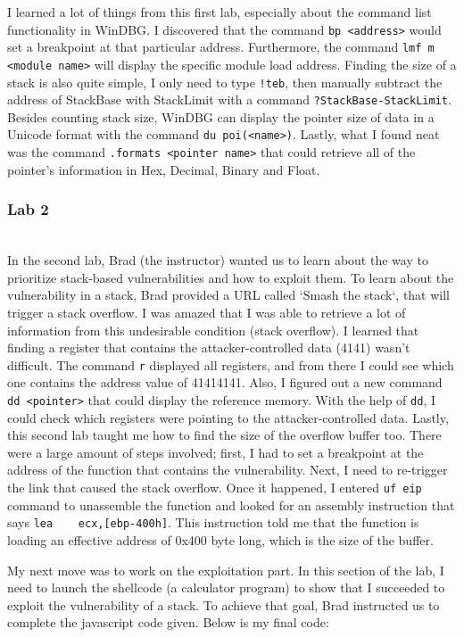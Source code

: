 \documentclass[letterpaper,10pt,titlepage,draftclsnofoot,onecolumn]{IEEEtran}
\begin{document}
I learned a lot of things from this first lab, especially about the command list functionality in WinDBG.
I discovered that the command \verb|bp <address>| would set a breakpoint at that particular address.
Furthermore, the command \verb|lmf m <module name>| will display the specific module load address.
Finding the size of a stack is also quite simple, I only need to type \verb|!teb|, then manually subtract the address of StackBase with StackLimit with a command \verb|?StackBase-StackLimit|.
Besides counting stack size, WinDBG can display the pointer size of data in a Unicode format with the command \verb|du poi(<name>)|. 
Lastly, what I found neat was the command \verb|.formats <pointer name>| that could retrieve all of the pointer's information in Hex, Decimal, Binary and Float.
\hfill\\
\subsubsection{Lab 2}
\hfill\\
In the second lab, Brad (the instructor) wanted us to learn about the way to prioritize stack-based vulnerabilities and how to exploit them.
To learn about the vulnerability in a stack, Brad provided a URL called `Smash the stack`, that will trigger a stack overflow. 
I was amazed that I was able to retrieve a lot of information from this undesirable condition (stack overflow).
I learned that finding a register that contains the attacker-controlled data (4141) wasn't difficult.
The command \verb|r| displayed all registers, and from there I could see which one contains the address value of 41414141.
Also, I figured out a new command \verb|dd <pointer>| that could display the reference memory. 
With the help of \verb|dd|, I could check which registers were pointing to the attacker-controlled data.
Lastly, this second lab taught me how to find the size of the overflow buffer too.
There were a large amount of steps involved; first, I had to set a breakpoint at the address of the function that contains the vulnerability.
Next, I need to re-trigger the link that caused the stack overflow.
Once it happened, I entered \verb|uf eip| command to unassemble the function and looked for an assembly instruction that says \verb|lea    ecx,[ebp-400h]|.
This instruction told me that the function is loading an effective address of 0x400 byte long, which is the size of the buffer.

My next move was to work on the exploitation part. 
In this section of the lab, I need to launch the shellcode (a calculator program) to show that I succeeded to exploit the vulnerability of a stack. 
To achieve that goal, Brad instructed us to complete the javascript code given.
Below is my final code:
\end{document}
